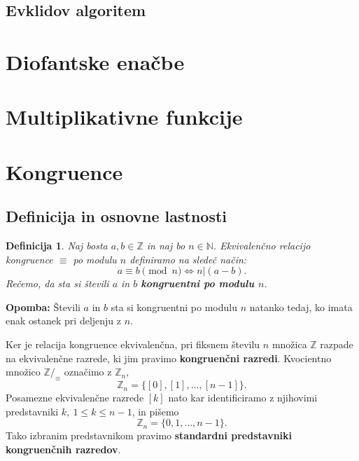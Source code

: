 \documentclass[12pt, a4paper]{article}
\newtheorem{defi}{Definicija}
\newenvironment{opom}[1][]{\par\medskip\noindent \textbf{Opomba: }}{\medskip}
\begin{document}
\subsection{Evklidov algoritem}























\section{Diofantske enačbe}
\section{Multiplikativne funkcije}
\section{Kongruence} \label{kongruence}

\subsection{Definicija in osnovne lastnosti}

\begin{defi}
Naj bosta $a,b\in \mathbb{Z}$ in naj bo $n \in \mathbb{N}$. Ekvivalenčno relacijo kongruence $\equiv$ po modulu $n$ definiramo na sledeč način:
$$a\equiv b \pmod n \iff n|(a-b).$$
Rečemo, da sta si števili $a$ in $b$ \textbf{kongruentni po modulu $n$}.
\end{defi}

\begin{opom}
Števili $a$ in $b$ sta si kongruentni po modulu $n$ natanko tedaj, ko imata enak ostanek pri deljenju z $n$.
\end{opom}

Ker je relacija kongruence ekvivalenčna, pri fiksnem številu $n$ množica $\mathbb{Z}$ razpade na ekvivalenčne razrede, ki jim pravimo \textbf{kongruenčni razredi}. Kvocientno množico $\mathbb{Z}/_{\equiv}$ označimo z $\mathbb{Z}_{n}$,
$$\mathbb{Z}_{n} = \{[0], [1],\dots,[n-1]\}.$$
Posamezne ekvivalenčne razrede $[k]$ nato kar identificiramo z njihovimi predstavniki $k, \ 1\leq k \leq n-1$, in pišemo
$$\mathbb{Z}_{n} = \{0, 1,\dots,n-1\}.$$
Tako izbranim predstavnikom pravimo \textbf{standardni predstavniki kongruenčnih razredov}.
\end{document}
